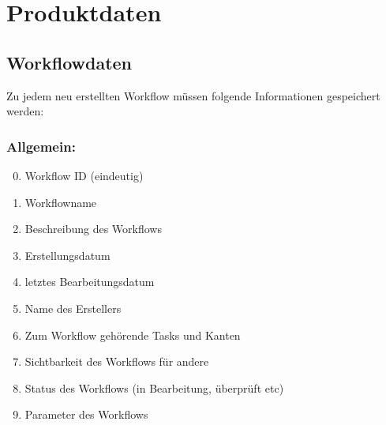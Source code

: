 

\chapter{Produktdaten}

    \section{Workflowdaten}
    Zu jedem neu erstellten Workflow müssen folgende Informationen gespeichert werden:
        \subsection{Allgemein:}
            \begin{enumerate}[font={\bfseries}, label=PD1{\arabic*}0, wide=0pt, labelindent=1em, leftmargin=*]
                \setcounter{enumi}{-1}
                \item \label{workflowID:1} Workflow ID (eindeutig)
                \item Workflowname
                \item Beschreibung des Workflows
                \item Erstellungsdatum
                \item \label{letztesBearbeitungsdatum} letztes Bearbeitungsdatum
                \item Name des Erstellers
                \item \label{korrekteSpeicherungDesWorkflows} Zum Workflow gehörende Tasks und Kanten
                \item \label{Sichtbarkeit} Sichtbarkeit des Workflows für andere
                \item \label{statusDesWorkflows} Status des Workflows (in Bearbeitung, überprüft etc)
                \item \label{Parameter}  Parameter des Workflows
            \end{enumerate}
